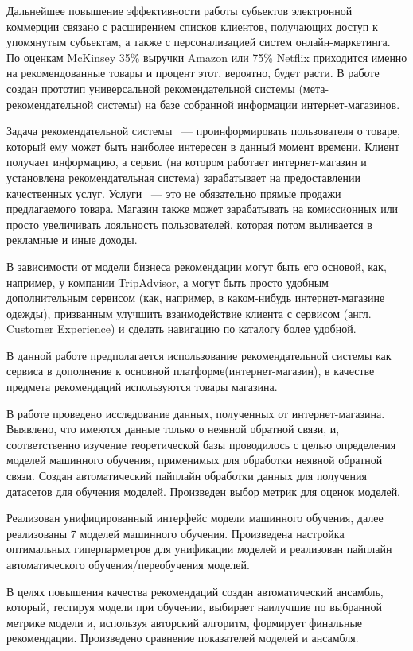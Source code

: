 \documentclass[14pt]{mmcs_article}
\begin{document}
Дальнейшее повышение эффективности работы субьектов электронной коммерции связано с расширением списков клиентов, получающих доступ к упомянутым субьектам, а также с персонализацией систем онлайн-маркетинга. По оценкам McKinsey \cite{INTRO:a1} 35\% выручки Amazon или 75\% Netflix приходится именно на рекомендованные товары и процент этот, вероятно, будет расти. В работе создан прототип универсальной рекомендательной системы (мета-рекомендательной системы) на базе собранной информации интернет-магазинов. 

Задача рекомендательной системы ~--- проинформировать пользователя о товаре, который ему может быть наиболее интересен в данный момент времени. Клиент получает информацию, а сервис (на котором работает интернет-магазин и установлена рекомендательная система) зарабатывает на предоставлении качественных услуг. Услуги ~--- это не обязательно прямые продажи предлагаемого товара. Магазин также может зарабатывать на комиссионных или просто увеличивать лояльность пользователей, которая потом выливается в рекламные и иные доходы.

В зависимости от модели бизнеса рекомендации могут быть его основой, как, например, у компании TripAdvisor, а могут быть просто удобным дополнительным сервисом (как, например, в каком-нибудь интернет-магазине одежды), призванным улучшить взаимодействие клиента с сервисом (англ. Customer Experience) и сделать навигацию по каталогу более удобной. 

В данной работе предполагается использование рекомендательной системы  как сервиса в дополнение к основной платформе(интернет-магазин), в качестве предмета рекомендаций используются товары магазина. 

В работе проведено исследование данных, полученных от интернет-магазина. Выявлено, что имеются данные только о неявной обратной связи, и, соответственно изучение теоретической базы проводилось с целью определения  моделей машинного обучения, применимых для обработки неявной обратной связи. Создан автоматический  пайплайн обработки данных для получения датасетов для обучения моделей. Произведен выбор метрик для оценок моделей.

Реализован унифицированный интерфейс модели машинного обучения, далее реализованы 7 моделей машинного обучения. Произведена настройка оптимальных гиперпарметров для унификации моделей и реализован пайплайн автоматического обучения/переобучения моделей.

В целях повышения качества рекомендаций создан автоматический ансамбль, который, тестируя модели при обучении, выбирает наилучшие по выбранной метрике модели и, используя авторский алгоритм, формирует финальные рекомендации. Произведено сравнение показателей моделей и ансамбля.
\end{document}
